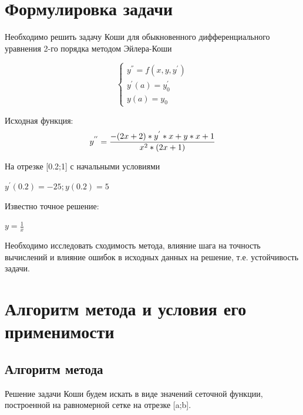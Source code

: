 






\section{Формулировка задачи}

Необходимо решить задачу Коши для обыкновенного дифференциального уравнения 2-го порядка методом Эйлера-Коши

\begin{equation}
	\begin{cases}
	  y^{''}=f(x,y,y^{'}) \\
	  y^{'}(a)=y_{0}^{'} \\
	  y(a) = y_{0} 	
	\end{cases}
\end{equation}

Исходная функция: 
\begin{equation}
	y^{''}=\frac{-(2x+2)*y^{'}*x+y*x+1}{x^{2}*(2x+1)} \\
\end{equation}

На отрезке [0.2;1] с начальными условиями

\begin{math}
	y^{'}(0.2)=-25 ;
	y(0.2) = 5 
\end{math}

Известно точное решение:

\begin{math}
	y=\frac{1}{x}
\end{math}

Необходимо исследовать сходимость метода, влияние шага на точность вычислений и влияние ошибок в исходных данных на решение, т.е. устойчивость задачи.

\section{Алгоритм метода и условия его применимости}

\subsection{Алгоритм метода}

Решение задачи Коши будем искать в виде значений сеточной функции, построенной на равномерной сетке на отрезке [a;b]. 


